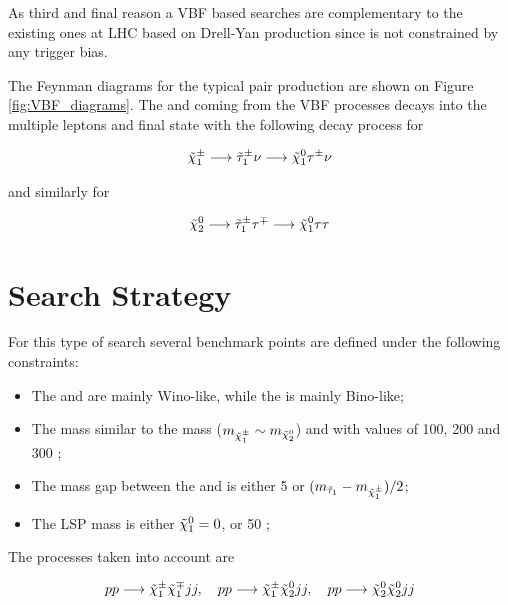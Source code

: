 As third and final reason a VBF based searches are complementary to the existing ones at LHC based on Drell-Yan production since is not constrained by any trigger bias. 

The Feynman diagrams for the typical \charginopm \neutralinotwo pair production are shown on  Figure \ref{fig:VBF_diagrams}. The \charginopm and \neutralinotwo coming from the VBF processes decays into the multiple leptons and \neutralinoone final state with the following decay process for \charginopm

\begin{equation}
\tilde{\chi}^{\pm}_{1} \longrightarrow \tilde{\tau}_{1}^{\pm} \nu \longrightarrow \tilde{\chi}^{0}_{1} \tau^{\pm} \nu
\end{equation}

and similarly for \neutralinotwo

\begin{equation}
\tilde{\chi}^{0}_{2} \longrightarrow \tilde{\tau}_{1}^{\pm} \tau^{\mp} \longrightarrow \tilde{\chi}^{0}_{1} \tau \tau
\end{equation}

\section {Search Strategy}
\label{section::search_strategy}

For this type of search several benchmark points are defined under the following constraints:
\begin{itemize}
	\item The \charginopm and \neutralinotwo are mainly Wino-like, while the \neutralinoone is mainly Bino-like;
	\item The \charginomp mass similar to the \neutralinotwo mass ($m_{\tilde{\chi}^{\pm}_{1}} \sim m_{\tilde{\chi}^{0}_{2}}$) and with values of 100, 200 and 300 \gev;
	\item The mass gap between the \stau and \charginopm is either 5 \gev or $(m_{\tilde{\tau}_{1}} - m_{\tilde{\chi}^{\pm}_{1}})/2$;
	\item The LSP mass is either $\tilde{\chi}^{0}_{1} = 0$, or 50 \gev;
\end{itemize}

The processes taken into account are

\begin{equation}
pp \longrightarrow \tilde{\chi}^{\pm}_{1} \tilde{\chi}^{\mp}_{1} jj, \quad pp \longrightarrow \tilde{\chi}^{\pm}_{1} \tilde{\chi}^{0}_{2} jj, \quad pp \longrightarrow \tilde{\chi}^{0}_{2} \tilde{\chi}^{0}_{2} jj
\end{equation}

